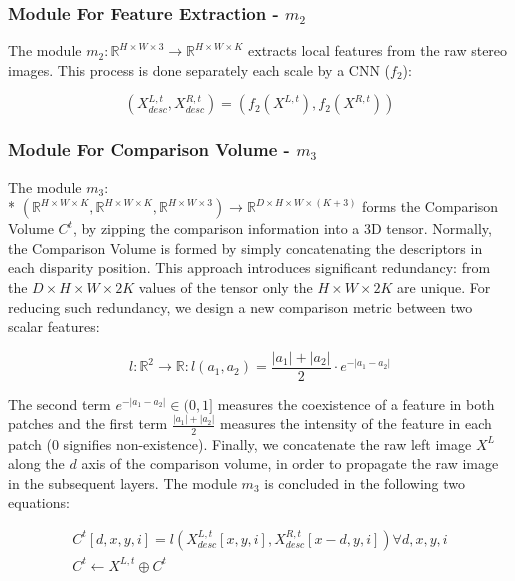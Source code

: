 \documentclass[runningheads]{llncs}
\begin{document}
\subsubsection{Module For Feature Extraction - $m_2$}

The module $m_2: \mathbb{R}^{H \times W \times 3} \rightarrow \mathbb{R}^{H \times W \times K}$ extracts local features from the raw stereo images. This process is done separately each scale by a CNN ($f_2$):

\begin{equation} \label{eq:f_1}
    (X^{L,t}_{desc}, X^{R,t}_{desc}) = (f_2(X^{L,t}), f_2(X^{R, t}))
\end{equation} 

\subsubsection{Module For Comparison Volume - $m_3$}

The module $m_3:$ \\* $(\mathbb{R}^{H \times W \times K}, \mathbb{R}^{H \times W \times K}, \mathbb{R}^{H \times W \times 3}) \rightarrow \mathbb{R}^{D \times H \times W \times (K+3)}$ forms the Comparison Volume $C^t$, by zipping the comparison information into a 3D tensor. Normally, the Comparison Volume is formed by simply concatenating the descriptors in each disparity position. This approach introduces significant redundancy: from the $D \times H \times W \times 2K$ values of the tensor only the $H \times W \times 2K$ are unique. For reducing such redundancy, we design a new comparison metric between two scalar features:

\begin{equation} \label{eq:m}
    l: \mathbb{R}^2 \rightarrow \mathbb{R}: l(a_1, a_2) = \frac{|a_1| + |a_2|}{2} \cdot e^{-|a_1 - a_2|}    
\end{equation}


The second term $e^{-|a_1 - a_2|} \in (0,1]$ measures the coexistence of a feature in both patches and the first term $\frac{|a_1| + |a_2|}{2}$ measures the intensity of the feature in each patch ($0$ signifies non-existence). Finally, we concatenate the raw left image $X^L$ along the $d$ axis of the comparison volume, in order to propagate the raw image in the subsequent layers. The module $m_3$ is concluded in the following two equations:

\begin{gather} \label{eq:comparison_volume}
    C^t[d, x, y, i] = l( X^{L, t}_{desc}[x,y,i], X^{R, t}_{desc}[x-d,y, i]) \forall d,x,y,i\\
    C^t \leftarrow X^{L, t} \oplus C^t
\end{gather}
\end{document}

